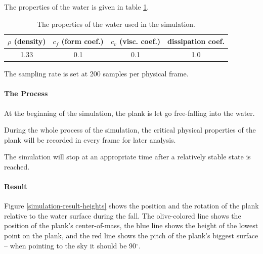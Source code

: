 The properties of the water is given in table \ref{simulation-water-properties}.

\begin{table}[h]
	\centering
	\begin{tabular}{ c c c c }
		\hline
		$\rho$ {\footnotesize(density)} & $c_f$ {\footnotesize(form coef.)} & $c_v$ {\footnotesize(visc. coef.)} & {\small dissipation coef.} \\
		\hline
		1.33 & 0.1 & 0.1 & 1.0 \\
		\hline
	\end{tabular}
	\caption{The properties of the water used in the simulation.}
	\label{simulation-water-properties}
\end{table}

The sampling rate is set at 200 samples per physical frame.

\paragraph*{The Process}

At the beginning of the simulation, the plank is let go free-falling into the water.

During the whole process of the simulation, the critical physical properties of the plank will be recorded in every frame for later analysis.

The simulation will stop at an appropriate time after a relatively stable state is reached.

\paragraph*{Result}

Figure \ref{simulation-result-heights} shows the position and the rotation of the plank relative to the water surface during the fall.
The olive-colored line shows the position of the plank's center-of-mass, the blue line shows the height of the lowest point on the plank, and the red line shows the pitch of the plank's biggest surface -- when pointing to the sky it should be 90$^\circ$.


